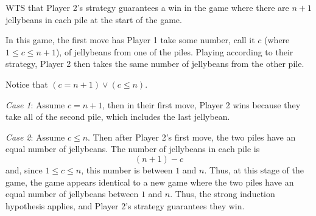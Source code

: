 \documentclass[12pt, oneside]{article}
\begin{document}
WTS that Player 2's strategy guarantees a win in the game where
there are $n+1$ jellybeans in each pile at the start of the game.

In this game, the first move has Player 1 take 
some number, call it $c$ (where $1 \leq c \leq n+1$),
of jellybeans from one of the piles. 
Playing according to their strategy, Player 2 then 
takes the same number of jellybeans from  the other pile.

Notice that $(c = n+1) \lor (c \leq n)$.

{\it Case 1}: Assume $c = n+1$, then in their first move, 
Player 2 wins because they take all of the second pile, which 
includes the last jellybean.

{\it Case 2}: Assume $c \leq n$. Then after Player 2's first move,
the two piles have an equal number of jellybeans. The number
of jellybeans in each pile is 
\[
    (n+1) - c
\]
and, since $1 \leq c \leq n$, this number is between $1$ and $n$.
Thus, at this stage of the game, the game appears identical to a new 
game where the two piles have an equal number of jellybeans between $1$
and $n$. Thus, the strong induction hypothesis applies, and Player 2's
strategy guarantees they win.

 \vfill
\end{document}
